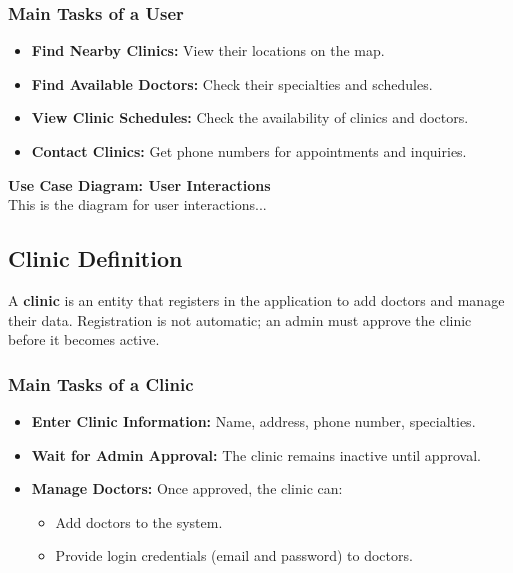\documentclass[12pt]{report}
\begin{document}
\subsubsection{\textbf{Main Tasks of a User}}  
\begin{itemize}  
    \item \textbf{Find Nearby Clinics:} View their locations on the map.  
    \item \textbf{Find Available Doctors:} Check their specialties and schedules.  
    \item \textbf{View Clinic Schedules:} Check the availability of clinics and doctors.  
    \item \textbf{Contact Clinics:} Get phone numbers for appointments and inquiries.  
\end{itemize}  

\vspace{0.5cm}  
\noindent \textbf{Use Case Diagram: User Interactions}  
\\This is the diagram for user interactions...\\  

\subsection{\textbf{Clinic Definition}}  

\noindent A \textbf{clinic} is an entity that registers in the application to add doctors and manage their data. Registration is not automatic; an admin must approve the clinic before it becomes active.  

\subsubsection{\textbf{Main Tasks of a Clinic}}  
\begin{itemize}  
    \item \textbf{Enter Clinic Information:} Name, address, phone number, specialties.  
    \item \textbf{Wait for Admin Approval:} The clinic remains inactive until approval.  
    \item \textbf{Manage Doctors:} Once approved, the clinic can:  
          \begin{itemize}  
              \item Add doctors to the system.  
              \item Provide login credentials (email and password) to doctors.  
          \end{itemize}  
\end{itemize}  
\end{document}
